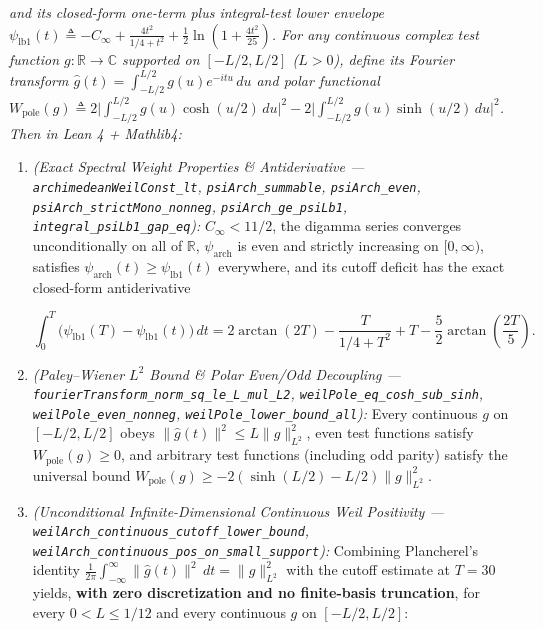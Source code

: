 \documentclass[
  11pt,
]{article}
\begin{document}
\emph{and its closed-form one-term plus integral-test lower envelope
\(\psi_{\text{lb}1}(t) \triangleq -C_\infty + \frac{4t^2}{1/4 + t^2} + \frac{1}{2}\ln\!\left(1 + \frac{4t^2}{25}\right)\).
For any continuous complex test function
\(g : \mathbb{R} \to \mathbb{C}\) supported on \([-L/2, L/2]\)
(\(L > 0\)), define its Fourier transform
\(\widehat{g}(t) = \int_{-L/2}^{L/2} g(u)e^{-itu}\,du\) and polar
functional
\(W_{\text{pole}}(g) \triangleq 2\big|\int_{-L/2}^{L/2} g(u)\cosh(u/2)\,du\big|^2 - 2\big|\int_{-L/2}^{L/2} g(u)\sinh(u/2)\,du\big|^2\).
Then in Lean 4 + Mathlib4:}

\begin{enumerate}
\def\labelenumi{\arabic{enumi}.}
\item
  \emph{(Exact Spectral Weight Properties \& Antiderivative ---
  \texttt{archimedeanWeilConst\_lt}, \texttt{psiArch\_summable},
  \texttt{psiArch\_even}, \texttt{psiArch\_strictMono\_nonneg},
  \texttt{psiArch\_ge\_psiLb1}, \texttt{integral\_psiLb1\_gap\_eq}):}
  \(C_\infty < 11/2\), the digamma series converges unconditionally on
  all of \(\mathbb{R}\), \(\psi_{\text{arch}}\) is even and strictly
  increasing on \([0, \infty)\), satisfies
  \(\psi_{\text{arch}}(t) \ge \psi_{\text{lb}1}(t)\) everywhere, and its
  cutoff deficit has the exact closed-form antiderivative

  \[\int_0^T \big(\psi_{\text{lb}1}(T) - \psi_{\text{lb}1}(t)\big)\,dt = 2\arctan(2T) - \frac{T}{1/4 + T^2} + T - \frac{5}{2}\arctan\!\left(\frac{2T}{5}\right).\]
\item
  \emph{(Paley--Wiener \(L^2\) Bound \& Polar Even/Odd Decoupling ---
  \texttt{fourierTransform\_norm\_sq\_le\_L\_mul\_L2},
  \texttt{weilPole\_eq\_cosh\_sub\_sinh},
  \texttt{weilPole\_even\_nonneg},
  \texttt{weilPole\_lower\_bound\_all}):} Every continuous \(g\) on
  \([-L/2, L/2]\) obeys \(\|\widehat{g}(t)\|^2 \le L \|g\|_{L^2}^2\),
  even test functions satisfy \(W_{\text{pole}}(g) \ge 0\), and
  arbitrary test functions (including odd parity) satisfy the universal
  bound \(W_{\text{pole}}(g) \ge -2(\sinh(L/2) - L/2)\|g\|_{L^2}^2\).
\item
  \emph{(Unconditional Infinite-Dimensional Continuous Weil Positivity
  --- \texttt{weilArch\_continuous\_cutoff\_lower\_bound},
  \texttt{weilArch\_continuous\_pos\_on\_small\_support}):} Combining
  Plancherel's identity
  \(\frac{1}{2\pi}\int_{-\infty}^\infty \|\widehat{g}(t)\|^2\,dt = \|g\|_{L^2}^2\)
  with the cutoff estimate at \(T = 30\) yields, \textbf{with zero
  discretization and no finite-basis truncation}, for every
  \(0 < L \le 1/12\) and every continuous \(g\) on \([-L/2, L/2]\):


\end{enumerate}
\end{document}

